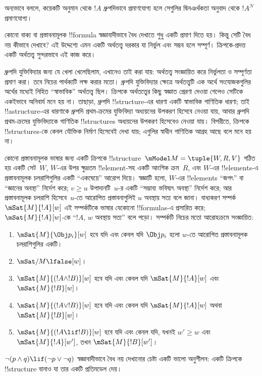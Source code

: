 \documentclass[../../../include/open-logic-section]{subfiles}
\begin{document}
অন্যভাবে বললে, কয়েকটি অনুমান থেকে $!A$ ধ্রুপদিভাবে প্রমাণযোগ্য হলে
সেগুলির দ্বিনঞর্থকতা অনুবাদ থেকে $!A^N$ প্রমাণযোগ্য।

কোনো বাক্য বা প্রস্তাবনামূলক !!{formula} স্বজ্ঞাবাদীভাবে বৈধ দেখাতে
শুধু একটি প্রমাণ দিতে হয়। কিন্তু সেটি বৈধ নয় কীভাবে দেখাবে? এই
উদ্দেশ্যে এমন একটি অর্থতত্ত্ব দরকার যা নির্ভুল এবং সম্ভব হলে সম্পূর্ণ।
ক্রিপকে-প্রদত্ত একটি অর্থতত্ত্ব সুন্দরভাবে এই কাজ করে।

ধ্রুপদি যুক্তিবিদ্যার জন্য যে খেলা খেলেছিলাম, এখানেও তাই করা যায়:
অর্থতত্ত্ব সংজ্ঞায়িত করে নির্ভুলতা ও সম্পূর্ণতা প্রমাণ করা। তবে নিচের
পার্থক্যটি লক্ষ করার মতো। ধ্রুপদি যুক্তিবিদ্যার ক্ষেত্রে অর্থতত্ত্বটি
এক অর্থে সংযোজকগুলির অর্থের মধ্যেই নিহিত “স্বাভাবিক” অর্থতত্ত্ব ছিল।
ক্রিপকে অর্থতত্ত্বের কিছু স্বজ্ঞাত প্রেরণা দেওয়া গেলেও সেটিকে একইভাবে
অনিবার্য মনে হয় না। তাছাড়া, ধ্রুপদি !!{structure}-এর ধারণা একটি
স্বাভাবিক গাণিতিক ধারণা; তাই !!a{structure}-এর ধারণাকে ধ্রুপদি
প্রথম-ক্রমের যুক্তিবিদ্যা অধ্যয়নের উপকরণ হিসেবে নেওয়া যায়, আবার
ধ্রুপদি প্রথম-ক্রমের যুক্তিবিদ্যাকে গাণিতিক !!{structure}s অধ্যয়নের
উপকরণ হিসেবেও নেওয়া যায়। বিপরীতে, ক্রিপকে !!{structure}s-কে কেবল
যৌক্তিক নির্মাণ হিসেবেই দেখা যায়; এগুলির স্বাধীন গাণিতিক আগ্রহ আছে
বলে মনে হয় না।

কোনো প্রস্তাবনামূলক ভাষার জন্য একটি ক্রিপকে !!{structure}~$\mModel M
= \tuple{W, R, V}$ গঠিত হয় একটি সেট~$W$, $W$-এর উপর ক্ষুদ্রতম
!!{element}-সহ একটি আংশিক ক্রম~$R$, এবং $W$-এর !!{element}s-এ
প্রস্তাবনামূলক চলরাশিগুলির একটি “একঘেয়ে” আরোপ দিয়ে। স্বজ্ঞাটি হলো,
$W$-এর !!{element}s “জগৎ” বা “জ্ঞানের অবস্থা” নির্দেশ করে; $v \geq
u$ উপাদানটি~$u$-র একটি “সম্ভাব্য ভবিষ্যৎ অবস্থা” নির্দেশ করে; আর
প্রস্তাবনামূলক চলরাশি হিসেবে~$u$-তে আরোপিত প্রস্তাবনাগুলিই $u$ অবস্থায়
সত্য বলে জানা। বাধ্যকরণ সম্পর্ক $\mSat{M}{!A}[w]$ এই সম্পর্কটিকে
ভাষার যেকোনো !!{formula}s-এ প্রসারিত করে; $\mSat{M}{!A}[w]$-কে
“$!A$, $w$ অবস্থায় সত্য” বলে পড়ো। সম্পর্কটি নিচের মতো আরোহক্রমে
সংজ্ঞায়িত:
\begin{enumerate}
\item $\mSat{M}{\Obj p_i}[w]$ হবে যদি এবং কেবল যদি $\Obj p_i$ হলো
  $w$-তে আরোপিত প্রস্তাবনামূলক চলরাশিগুলির একটি।
\item $\mSat/{M}{\lfalse}[w]$।
\item $\mSat{M}{(!A \land !B)}[w]$ হবে যদি এবং কেবল যদি
  $\mSat{M}{!A}[w]$ এবং $\mSat{M}{!B}[w]$।
\item $\mSat{M}{(!A \lor !B)}[w]$ হবে যদি এবং কেবল যদি
  $\mSat{M}{!A}[w]$ অথবা $\mSat{M}{!B}[w]$।
\item $\mSat{M}{(!A \lif !B)}[w]$ হবে যদি এবং কেবল যদি, যখনই
  $w' \geq w$ এবং $\mSat{M}{!A}[w']$, তখন $\mSat{M}{!B}[w']$।
\end{enumerate}
$\lnot (p \land q) \lif (\lnot p \lor \lnot q)$ স্বজ্ঞাবাদীভাবে
বৈধ নয় দেখানোর চেষ্টা একটি ভালো অনুশীলন: একটি ক্রিপকে
!!{structure} বানাও যা তার একটি প্রতিমডেল দেয়।
\end{document}
